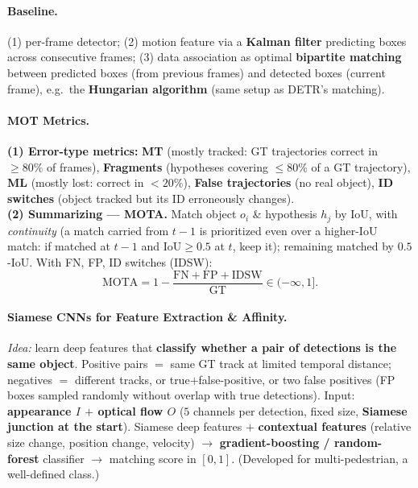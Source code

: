\documentclass{article}
\begin{document}
\paragraph{Baseline.} (1) per-frame detector; (2) motion feature via a \textbf{Kalman filter} predicting boxes across consecutive frames; (3) data association as optimal \textbf{bipartite matching} between predicted boxes (from previous frames) and detected boxes (current frame), e.g.\ the \textbf{Hungarian algorithm} (same setup as DETR's matching).

\paragraph{MOT Metrics.}
\textbf{(1) Error-type metrics:} \textbf{MT} (mostly tracked: GT trajectories correct in $\ge80\%$ of frames), \textbf{Fragments} (hypotheses covering $\le80\%$ of a GT trajectory), \textbf{ML} (mostly lost: correct in $<20\%$), \textbf{False trajectories} (no real object), \textbf{ID switches} (object tracked but its ID erroneously changes).\\
\textbf{(2) Summarizing --- MOTA.} Match object $o_i$ \& hypothesis $h_j$ by IoU, with \textit{continuity} (a match carried from $t-1$ is prioritized even over a higher-IoU match: if matched at $t-1$ and $\mathrm{IoU}\ge0.5$ at $t$, keep it); remaining matched by $0.5$-IoU. With FN, FP, ID switches (IDSW):
\begin{equation*}
\text{MOTA} = 1 - \frac{\text{FN}+\text{FP}+\text{IDSW}}{\text{GT}} \in (-\infty, 1].
\end{equation*}

\paragraph{Siamese CNNs for Feature Extraction \& Affinity.}
\textit{Idea:} learn deep features that \textbf{classify whether a pair of detections is the same object}. Positive pairs $=$ same GT track at limited temporal distance; negatives $=$ different tracks, or true$+$false-positive, or two false positives (FP boxes sampled randomly without overlap with true detections). Input: \textbf{appearance $I$ $+$ optical flow $O$} ($5$ channels per detection, fixed size, \textbf{Siamese junction at the start}). Siamese deep features $+$ \textbf{contextual features} (relative size change, position change, velocity) $\rightarrow$ \textbf{gradient-boosting / random-forest} classifier $\rightarrow$ matching score in $[0,1]$. (Developed for multi-pedestrian, a well-defined class.)
\end{document}

